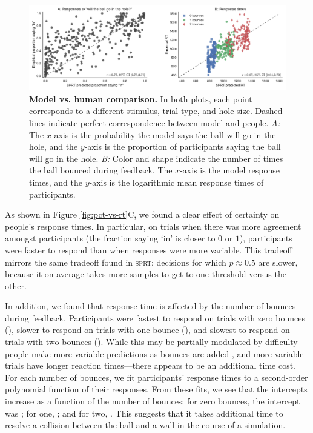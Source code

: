 \documentclass[10pt,letterpaper]{article}
\begin{document}
\begin{figure}[t]
    \begin{center}
        \includegraphics[width=\textwidth]{figures/model_results.pdf}
        \caption{\textbf{Model vs. human comparison.} 
        In both plots, each point corresponds to a different stimulus, trial type, and hole size. 
        Dashed lines indicate perfect correspondence between model and people. 
        \emph{A:} The $x$-axis is the probability the model says the ball will go in the hole, and the $y$-axis is the proportion of participants saying the ball will go in the hole. 
        \emph{B:} Color and shape indicate the number of times the ball bounced during feedback. 
        The $x$-axis is the model response times, and the $y$-axis is the logarithmic mean response times of participants.}
        \label{fig:model-results}
    \end{center}
\end{figure}

As shown in Figure \ref{fig:pct-vs-rt}C, we found a clear effect of certainty on people's response times.
In particular, on trials when there was more agreement amongst participants (the fraction saying `in' is closer to $0$ or $1$), participants were faster to respond than when responses were more variable.
This tradeoff mirrors the same tradeoff found in \textsc{sprt}: decisions for which $p\approx0.5$ are slower, because it on average takes more samples to get to one threshold versus the other.

In addition, we found that response time is affected by the number of bounces during feedback.
Participants were fastest to respond on trials with zero bounces (\RTZeroBounces{}), slower to respond on trials with one bounce (\RTOneBounces{}), and slowest to respond on trials with two bounces (\RTTwoBounces{}).
While this may be partially modulated by difficulty---people make more variable predictions as bounces are added \cite{Smith:2013fc}, and more variable trials have longer reaction times---there appears to be an additional time cost.
For each number of bounces, we fit participants' response times to a second-order polynomial function of their responses.
From these fits, we see that the intercepts increase as a function of the number of bounces: for zero bounces, the intercept was \InterceptZeroBounces{}; for one, \InterceptOneBounces{}; and for two, \InterceptTwoBounces{}.
This suggests that it takes additional time to resolve a collision between the ball and a wall in the course of a simulation.
\end{document}
